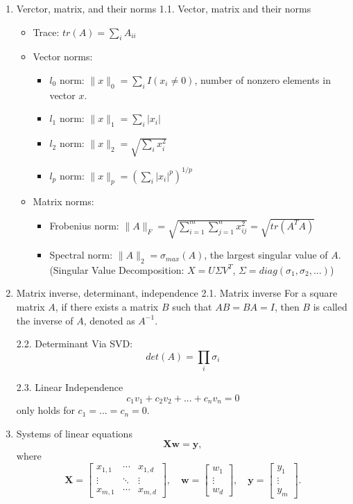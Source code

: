 \documentclass[
]{ctexart}
\providecommand{\tightlist}{%
  \setlength{\itemsep}{0pt}\setlength{\parskip}{0pt}}
\begin{document}
\begin{enumerate}
\def\labelenumi{\arabic{enumi}.}
\item
  Verctor, matrix, and their norms 1.1. Vector, matrix and their norms

  \begin{itemize}
  \tightlist
  \item
    Trace: \(tr(A) = \sum_{i} A_{ii}\)
  \item
    Vector norms:

    \begin{itemize}
    \tightlist
    \item
      \(l_0\) norm: \(\|x\|_0 = \sum_{i} I(x_i \neq 0)\), number of
      nonzero elements in vector \(x\).
    \item
      \(l_1\) norm: \(\|x\|_1 = \sum_{i} |x_i|\)
    \item
      \(l_2\) norm: \(\|x\|_2 = \sqrt{\sum_{i} x_i^2}\)
    \item
      \(l_p\) norm: \(\|x\|_p = (\sum_{i} |x_i|^p)^{1/p}\)
    \end{itemize}
  \item
    Matrix norms:

    \begin{itemize}
    \tightlist
    \item
      Frobenius norm:
      \(\|A\|_F = \sqrt{\sum_{i=1}^{m} \sum_{j=1}^{n} x_{ij}^2} = \sqrt{tr(A^TA)}\)
    \item
      Spectral norm: \(\|A\|_2 = \sigma_{max}(A)\), the largest singular
      value of \(A\). (Singular Value Decomposition:
      \(X = U\Sigma V^T\), \(\Sigma = diag(\sigma_1, \sigma_2, ...)\))
    \end{itemize}
  \end{itemize}
\item
  Matrix inverse, determinant, independence 2.1. Matrix inverse For a
  square matrix \(A\), if there exists a matrix \(B\) such that
  \(AB = BA = I\), then \(B\) is called the inverse of \(A\), denoted as
  \(A^{-1}\).

  2.2. Determinant Via SVD: \[det(A) = \prod_{i} \sigma_i\]

  2.3. Linear Independence \[c_1v_1 + c_2v_2 + ... + c_nv_n = 0\] only
  holds for \(c_1 = ... = c_n = 0\).
\item
  Systems of linear equations \[\mathbf{Xw} = \mathbf{y},\] where \[
   \mathbf{X} = \begin{bmatrix}
   x_{1,1} & \cdots & x_{1,d} \\
   \vdots & \ddots & \vdots \\
   x_{m,1} & \cdots & x_{m,d}
   \end{bmatrix}, \quad
   \mathbf{w} = \begin{bmatrix}
   w_1 \\
   \vdots \\
   w_d
   \end{bmatrix}, \quad
   \mathbf{y} = \begin{bmatrix}
   y_1 \\
   \vdots \\
   y_m
   \end{bmatrix}.
   \]
\end{enumerate}
\end{document}
